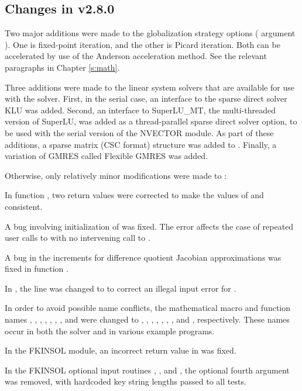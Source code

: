\subsection*{Changes in v2.8.0}

Two major additions were made to the globalization strategy options
( argument ).  One is fixed-point iteration,
and the other is Picard iteration.  Both can be accelerated by use
of the Anderson acceleration method.  See the relevant paragraphs in
Chapter \ref{s:math}.

Three additions were made to the linear system solvers that are
available for use with the {\kinsol} solver.  First, in the serial case,
an interface to the sparse direct solver KLU was added.
Second, an interface to SuperLU\_MT, the multi-threaded version of
SuperLU, was added as a thread-parallel sparse direct solver option,
to be used with the serial version of the NVECTOR module.
As part of these additions, a sparse matrix (CSC format) structure 
was added to {\kinsol}.  Finally, a variation of GMRES called
Flexible GMRES was added.

Otherwise, only relatively minor modifications were made to {\kinsol}:

In function , two return values were corrected to make the values
of  and  consistent.

A bug involving initialization of  was fixed.  
The error affects the case of repeated user calls to  with no
intervening call to .

A bug in the increments for difference quotient Jacobian approximations
was fixed in function .

In , the line  was changed to
 to correct an illegal input error for .

In order to avoid possible name conflicts, the mathematical macro
and function names , , , , ,
, , and  were changed to
, , , , ,
, , and , respectively.
These names occur in both the solver and in various example programs.

In the FKINSOL module, an incorrect return value  in 
was fixed.

In the FKINSOL optional input routines , , and
, the optional fourth argument  was removed,
with hardcoded key string lengths passed to all  tests.

